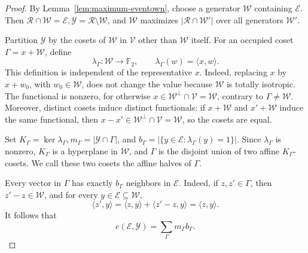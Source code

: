 \documentclass[11pt]{article}
\begin{document}
\begin{proof}
By Lemma~\ref{lem:maximum-eventown}, choose a generator \(\mathcal W\)
containing \(\mathcal E\).  Then
\(\mathcal R\cap\mathcal W=\mathcal E, \mathcal Y=\mathcal R\setminus\mathcal W\), 
and \(\mathcal W\) maximizes \(|\mathcal R\cap\mathcal W'|\) over all
generators \(\mathcal W'\).

Partition \(\mathcal Y\) by the cosets of \(\mathcal W\) in
\(\mathcal V\) other than \(\mathcal W\) itself.  For an occupied coset
\(\Gamma=x+\mathcal W\), define
\[
 \lambda_\Gamma:\mathcal W\longrightarrow\mathbb F_2,
 \qquad
 \lambda_\Gamma(w)=\langle x,w\rangle.
\]
This definition is independent of the representative \(x\). Indeed, replacing
\(x\) by \(x+w_0\), with \(w_0\in\mathcal W\), does not change the value
because \(\mathcal W\) is totally isotropic.  The functional is nonzero,
for otherwise \(x\in\mathcal W^\perp\cap\mathcal V=\mathcal W\), contrary
to \(\Gamma\ne\mathcal W\).  Moreover, distinct cosets induce distinct functionals:
if \(x+\mathcal W\) and \(x'+\mathcal W\) induce the same functional, then
\(x-x'\in\mathcal W^\perp\cap\mathcal V=\mathcal W\), so the cosets are
equal.

Set \(K_\Gamma=\ker\lambda_\Gamma,
 m_\Gamma=|\mathcal Y\cap\Gamma|\), and \(b_\Gamma =\bigl|\{y\in\mathcal E:\lambda_\Gamma(y)=1\}\bigr|\).
Since \(\lambda_\Gamma\) is nonzero, \(K_\Gamma\) is a hyperplane in
\(\mathcal W\), and \(\Gamma\) is the disjoint union of two affine
\(K_\Gamma\)-cosets.  We call these two cosets the affine halves of
\(\Gamma\).

Every vector in \(\Gamma\) has exactly \(b_\Gamma\) neighbors in
\(\mathcal E\).  Indeed, if \(z,z'\in\Gamma\), then
\(z'-z\in\mathcal W\), and for every \(y\in\mathcal E\subseteq\mathcal W\),
\[
 \langle z',y\rangle
 =
 \langle z,y\rangle+\langle z'-z,y\rangle
 =
 \langle z,y\rangle.
\]
It follows that
\begin{equation}
 e(\mathcal E,\mathcal Y)=\sum_\Gamma m_\Gamma b_\Gamma.
\label{eq:q-cosets}
\end{equation}


\end{proof}
\end{document}
